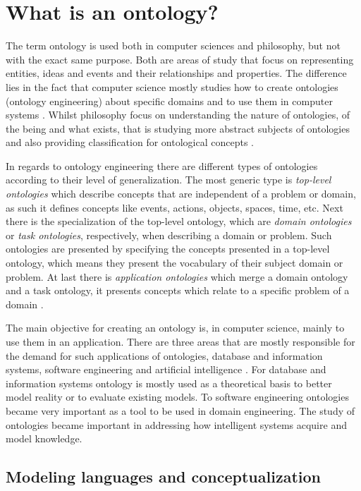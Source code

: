 \section{What is an ontology?}

The term ontology is used both in computer sciences and philosophy, but not with the exact same purpose. Both are areas of study that focus on representing entities, ideas and events and their relationships and properties. The difference lies in the fact that computer science mostly studies how to create ontologies (ontology engineering) about specific domains and to use them in computer systems \citep{gruber2009ontology}. Whilst philosophy focus on understanding the nature of ontologies, of the being and what exists, that is studying more abstract subjects of ontologies and also providing classification for ontological concepts \citep{guizzardi_ontological_2005}.

In regards to ontology engineering there are different types of ontologies according to their level of generalization. The most generic type is \textit{top-level ontologies} which describe concepts that are independent of a problem or domain, as such it defines concepts like events, actions, objects, spaces, time, etc. Next there is the specialization of the top-level ontology, which are \textit{domain ontologies} or \textit{task ontologies}, respectively, when describing a domain or problem. Such ontologies are presented by specifying the concepts presented in a top-level ontology, which means they present the vocabulary of their subject domain or problem. At last there is \textit{application ontologies} which merge a domain ontology and a task ontology, it presents concepts which relate to a specific problem of a domain \citep{guarino1998ontoformal}.

The main objective for creating an ontology is, in computer science, mainly to use them in an application. There are three areas that are mostly responsible for the demand for such applications of ontologies, database and information systems, software engineering and artificial intelligence \citep{smith2001ontology}. For database and information systems ontology is mostly used as a theoretical basis to better model reality or to evaluate existing models. To software engineering ontologies became very important as a tool to be used in domain engineering. The study of ontologies became important in addressing how intelligent systems acquire and model knowledge.

\subsection{Modeling languages and conceptualization}

